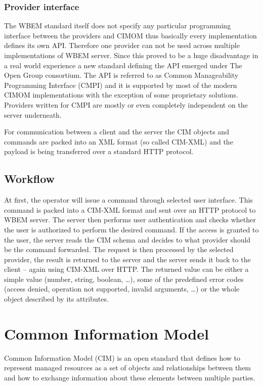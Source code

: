 \subsubsection{Provider interface}

The WBEM standard itself does not specify any particular programming interface
between the providers and CIMOM thus basically every implementation defines its
own API. Therefore one provider can not be used across multiple implementations
of WBEM server. Since this proved to be a huge disadvantage in a real world
experience a new standard defining the API emerged under The Open Group
consortium. The API is referred to as Common Manageability Programming Interface
(CMPI) and it is supported by most of the modern CIMOM implementations with the
exception of some proprietary solutions. Providers written for CMPI are mostly
or even completely independent on the server underneath.

For communication between a client and the server the CIM objects and commands
are packed into an XML format (so called CIM-XML) and the payload is being
transferred over a standard HTTP protocol.

\subsection{Workflow}
\label{wbem:architecture:workflow}

At first, the operator will issue a command through selected user interface.
This command is packed into a CIM-XML format and sent over an HTTP protocol to
WBEM server. The server then performs user authentication and checks whether the
user is authorized to perform the desired command. If the access is granted to
the user, the server reads the CIM schema and decides to what provider should be
the command forwarded. The request is then processed by the selected provider,
the result is returned to the server and the server sends it back to the client
-- again using CIM-XML over HTTP. The returned value can be either a simple
value (number, string, boolean, \ldots), some of the predefined error codes
(access denied, operation not supported, invalid arguments, \ldots) or the whole
object described by its attributes.

\section{Common Information Model}
\label{wbem:cim}

Common Information Model (CIM) is an open standard that defines how to represent
managed resources as a set of objects and relationships between them and how to
exchange information about these elements between multiple parties.

